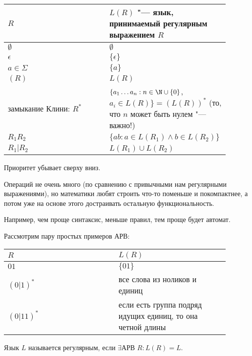 \begin{tabular}{p{0.45\linewidth}|p{0.45\linewidth}}
$R$ & $L(R)$ "--- язык, принимаемый регулярным выражением $R$ \\
\hline
$\emptyset$ & $\emptyset$ \\
$\epsilon$ & $\{\epsilon\}$ \\
$a \in \Sigma$ & $\{a\}$ \\
$(R)$ & $L(R)$ \\
замыкание Клини: $R^*$ & $\{a_1 \dots a_n: n \in \N \cup \{0\}$, $a_i \in L(R)\} = (L(R))^*$ (то, что $n$ может быть нулем "--- важно!) \\
$R_1R_2$ & $\{ab: a \in L(R_1) \land b \in L(R_2)\}$ \\
$R_1 | R_2$ & $L(R_1) \cup L(R_2)$
\end{tabular}

Приоритет убывает сверху вниз.

\begin{Rem}
Операций не очень много (по сравнению с привычными нам регулярными выражениями), но математики любят строить что-то поменьше и покомпактнее, а потом уже на основе этого достраивать остальную функциональность.

Например, чем проще синтаксис, меньше правил, тем проще будет автомат.
\end{Rem}

\begin{exmp}
Рассмотрим пару простых примеров АРВ:

\begin{tabular}{p{0.45\linewidth} | p{0.45\linewidth}}
$R$ & $L(R)$ \\
\hline
$01$ & $\{01\}$ \\
$(0|1)^*$ & все слова из ноликов и единиц \\
$(0|11)^*$ & если есть группа подряд идущих единиц, то она четной длины
\end{tabular}
\end{exmp}

\begin{Def}
Язык $L$ называется регулярным, если $\exists \text{АРВ } R: L(R) = L$.
\end{Def}